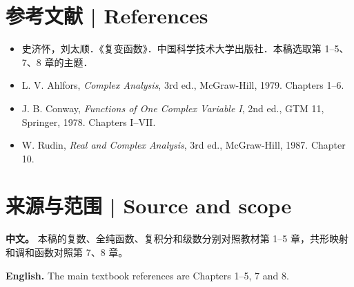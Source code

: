 \documentclass[UTF8,11pt,a4paper]{ctexart}
\newcommand{\APS}[2]{\par\noindent\textbf{中文。} #1\par\noindent\textbf{English.} #2\par\smallskip}
\begin{document}
\section*{参考文献 | References}
\begin{itemize}
\item[{[1]}] 史济怀，刘太顺．《复变函数》．中国科学技术大学出版社．本稿选取第 1--5、7、8 章的主题．
\item[{[2]}] L. V. Ahlfors, \emph{Complex Analysis}, 3rd ed., McGraw-Hill, 1979. Chapters 1--6.
\item[{[3]}] J. B. Conway, \emph{Functions of One Complex Variable I}, 2nd ed., GTM 11, Springer, 1978. Chapters I--VII.
\item[{[4]}] W. Rudin, \emph{Real and Complex Analysis}, 3rd ed., McGraw-Hill, 1987. Chapter 10.
\end{itemize}

\section*{来源与范围 | Source and scope}
\APS{本稿的复数、全纯函数、复积分和级数分别对照教材第 1--5 章，共形映射和调和函数对照第 7、8 章。}{The main textbook references are Chapters 1--5, 7 and 8.}
\end{document}
